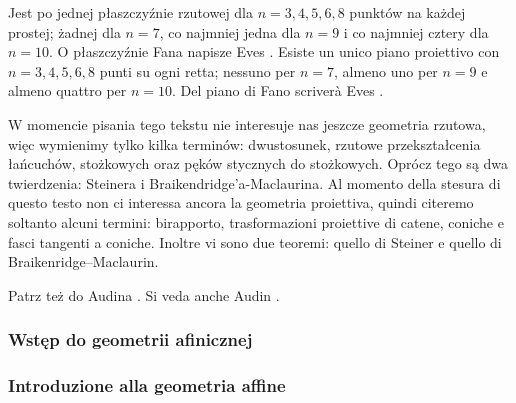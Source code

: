 Jest po jednej płaszczyźnie rzutowej dla $n = 3, 4, 5, 6, 8$ punktów na każdej prostej; żadnej dla $n = 7$, co najmniej jedna dla $n = 9$ i co najmniej cztery dla $n = 10$. %
O płaszczyźnie Fana napisze Eves \cite[s. 366]{eves1_1972}. %
Esiste un unico piano proiettivo con $n = 3, 4, 5, 6, 8$ punti su ogni retta; nessuno per $n = 7$, almeno uno per $n = 9$ e almeno quattro per $n = 10$. %
Del piano di Fano scriverà Eves \cite[p. 366]{eves1_1972}. %

W momencie pisania tego tekstu nie interesuje nas jeszcze geometria rzutowa, więc wymienimy tylko kilka terminów: %
dwustosunek, %
rzutowe przekształcenia łańcuchów, stożkowych oraz pęków stycznych do stożkowych. %
Oprócz tego są dwa twierdzenia: Steinera i Braikendridge'a-Maclaurina. %
Al momento della stesura di questo testo non ci interessa ancora la geometria proiettiva, quindi citeremo soltanto alcuni termini: %
birapporto, %
trasformazioni proiettive di catene, coniche e fasci tangenti a coniche. %
Inoltre vi sono due teoremi: quello di Steiner e quello di Braikenridge--Maclaurin. %

Patrz też do Audina \cite[s. 143-182]{audin_2003}. %
Si veda anche Audin \cite[p. 143--182]{audin_2003}. %

\subsubsection{Wstęp do geometrii afinicznej} %
\subsubsection{Introduzione alla geometria affine} %

